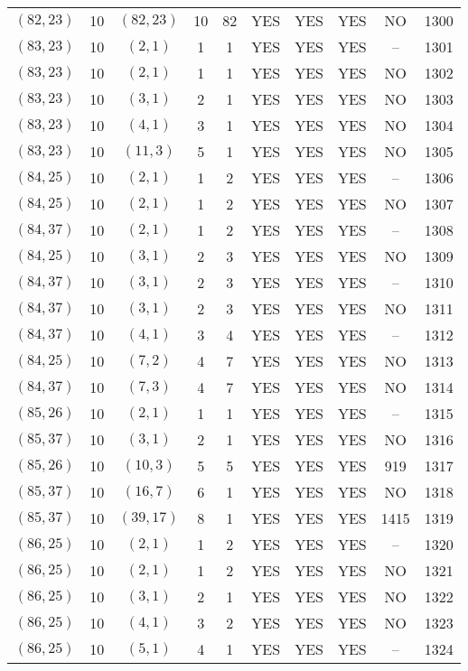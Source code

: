 \begin{longtable}{|c|c|c|c|c|c|c|c|c|c|}
$(82, 23)$ & 10 & $(82, 23)$ & 10 & 82 & YES & YES & YES & NO & 1300\\
$(83, 23)$ & 10 & $(2, 1)$ & 1 & 1 & YES & YES & YES & -- & 1301\\
$(83, 23)$ & 10 & $(2, 1)$ & 1 & 1 & YES & YES & YES & NO & 1302\\
$(83, 23)$ & 10 & $(3, 1)$ & 2 & 1 & YES & YES & YES & NO & 1303\\
$(83, 23)$ & 10 & $(4, 1)$ & 3 & 1 & YES & YES & YES & NO & 1304\\
$(83, 23)$ & 10 & $(11, 3)$ & 5 & 1 & YES & YES & YES & NO & 1305\\
$(84, 25)$ & 10 & $(2, 1)$ & 1 & 2 & YES & YES & YES & -- & 1306\\
$(84, 25)$ & 10 & $(2, 1)$ & 1 & 2 & YES & YES & YES & NO & 1307\\
$(84, 37)$ & 10 & $(2, 1)$ & 1 & 2 & YES & YES & YES & -- & 1308\\
$(84, 25)$ & 10 & $(3, 1)$ & 2 & 3 & YES & YES & YES & NO & 1309\\
$(84, 37)$ & 10 & $(3, 1)$ & 2 & 3 & YES & YES & YES & -- & 1310\\
$(84, 37)$ & 10 & $(3, 1)$ & 2 & 3 & YES & YES & YES & NO & 1311\\
$(84, 37)$ & 10 & $(4, 1)$ & 3 & 4 & YES & YES & YES & -- & 1312\\
$(84, 25)$ & 10 & $(7, 2)$ & 4 & 7 & YES & YES & YES & NO & 1313\\
$(84, 37)$ & 10 & $(7, 3)$ & 4 & 7 & YES & YES & YES & NO & 1314\\
$(85, 26)$ & 10 & $(2, 1)$ & 1 & 1 & YES & YES & YES & -- & 1315\\
$(85, 37)$ & 10 & $(3, 1)$ & 2 & 1 & YES & YES & YES & NO & 1316\\
$(85, 26)$ & 10 & $(10, 3)$ & 5 & 5 & YES & YES & YES & 919 & 1317\\
$(85, 37)$ & 10 & $(16, 7)$ & 6 & 1 & YES & YES & YES & NO & 1318\\
$(85, 37)$ & 10 & $(39, 17)$ & 8 & 1 & YES & YES & YES & 1415 & 1319\\
$(86, 25)$ & 10 & $(2, 1)$ & 1 & 2 & YES & YES & YES & -- & 1320\\
$(86, 25)$ & 10 & $(2, 1)$ & 1 & 2 & YES & YES & YES & NO & 1321\\
$(86, 25)$ & 10 & $(3, 1)$ & 2 & 1 & YES & YES & YES & NO & 1322\\
$(86, 25)$ & 10 & $(4, 1)$ & 3 & 2 & YES & YES & YES & NO & 1323\\
$(86, 25)$ & 10 & $(5, 1)$ & 4 & 1 & YES & YES & YES & -- & 1324\\

\end{longtable}
